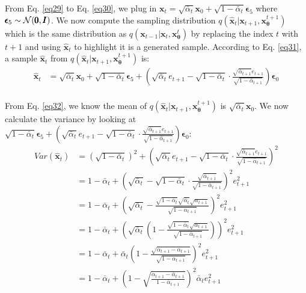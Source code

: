 \documentclass{article} \usepackage{iclr2024_conference,times}
\begin{document}
\noindent
From Eq. \ref{eq29} to Eq. \ref{eq30}, we plug in $\pmb{x}_t = \sqrt{\bar{\alpha}_t} \pmb{x}_0 +   \sqrt{1 - \bar{\alpha}_t} \pmb{\epsilon}_5$ where $\pmb{\epsilon}_5 \sim {\cal N} (\pmb{0}, \pmb{I})$. We now compute the sampling distribution $q(\hat{\pmb{x}}_{t} | \pmb{x}_{t+1}, \pmb{x}^{t+1}_{\pmb{\theta}})$ which is the same distribution as $q(\pmb{x}_{t-1} | \pmb{x}_t, \pmb{x}^{t}_{\pmb{\theta}})$ by replacing the index $t$ with $t+1$ and using $\hat{\pmb{x}}_{t}$ to highlight it is a generated sample. According to Eq. \ref{eq31}, a sample $\hat{\pmb{x}}_{t}$ from $q(\hat{\pmb{x}}_{t} | \pmb{x}_{t+1}, \pmb{x}^{t+1}_{\pmb{\theta}})$ is:
\begin{align}
\hat{\pmb{x}}_{t} & = \sqrt{\bar{\alpha}_{t}} \pmb{x}_{0} + \sqrt{1-\bar{\alpha}_{t}} \pmb{\epsilon}_5 + (\sqrt{\bar{\alpha}_{t}} e_{t+1} - \sqrt{1-\bar{\alpha}_{t}} \cdot \frac{\sqrt{\bar{\alpha}_{t+1}} e_{t+1}}{\sqrt{1-\bar{\alpha}_{t+1}}})\pmb{\epsilon}_0 \label{eq32} \\
\nonumber
\end{align}

\noindent
From Eq. \ref{eq32}, we know the mean of $q(\hat{\pmb{x}}_{t} | \pmb{x}_{t+1}, \pmb{x}^{t+1}_{\pmb{\theta}})$ is $ \sqrt{\bar{\alpha}_{t}} \pmb{x}_{0}$. We now calculate the variance by looking at $\sqrt{1-\bar{\alpha}_{t}} \pmb{\epsilon}_5 + (\sqrt{\bar{\alpha}_{t}} e_{t+1} - \sqrt{1-\bar{\alpha}_{t}} \cdot \frac{\sqrt{\bar{\alpha}_{t+1}} e_{t+1}}{\sqrt{1-\bar{\alpha}_{t+1}}})\pmb{\epsilon}_0$:
\begin{align}
Var(\hat{\pmb{x}}_{t}) & = (\sqrt{1-\bar{\alpha}_{t}})^2 + (\sqrt{\bar{\alpha}_{t}} e_{t+1} - \sqrt{1-\bar{\alpha}_{t}} \cdot \frac{\sqrt{\bar{\alpha}_{t+1}} e_{t+1}}{\sqrt{1-\bar{\alpha}_{t+1}}})^2  \nonumber \\
& = 1-\bar{\alpha}_{t} + (\sqrt{\bar{\alpha}_{t}} - \sqrt{1-\bar{\alpha}_{t}} \cdot \frac{\sqrt{\bar{\alpha}_{t+1}}}{\sqrt{1-\bar{\alpha}_{t+1}}})^2 e_{t+1}^2 \nonumber \\
& = 1-\bar{\alpha}_{t} + (\sqrt{\bar{\alpha}_{t}} - \frac{ \sqrt{1-\bar{\alpha}_{t}} \sqrt{\bar{\alpha}_{t}} \sqrt{\alpha_{t+1}} }{\sqrt{1-\bar{\alpha}_{t+1}}})^2 e_{t+1}^2 \nonumber \\
& = 1-\bar{\alpha}_{t} + (\sqrt{\bar{\alpha}_{t}} (1 - \frac{ \sqrt{1-\bar{\alpha}_{t}} \sqrt{\alpha_{t+1}} }{\sqrt{1-\bar{\alpha}_{t+1}}}) )^2 e_{t+1}^2 \nonumber \\
& = 1-\bar{\alpha}_{t} + \bar{\alpha}_{t} (1 - \frac{ \sqrt{\alpha_{t+1} - \bar{\alpha}_{t+1}}}{\sqrt{1-\bar{\alpha}_{t+1}}}) ^2 e_{t+1}^2 \nonumber \\
& = 1-\bar{\alpha}_{t} +  (1 - \sqrt{\frac{\alpha_{t+1} - \bar{\alpha}_{t+1}}{1-\bar{\alpha}_{t+1}}} ) ^2 \bar{\alpha}_{t} e_{t+1}^2 \label{eq33} \\
\nonumber
\end{align}
\end{document}
